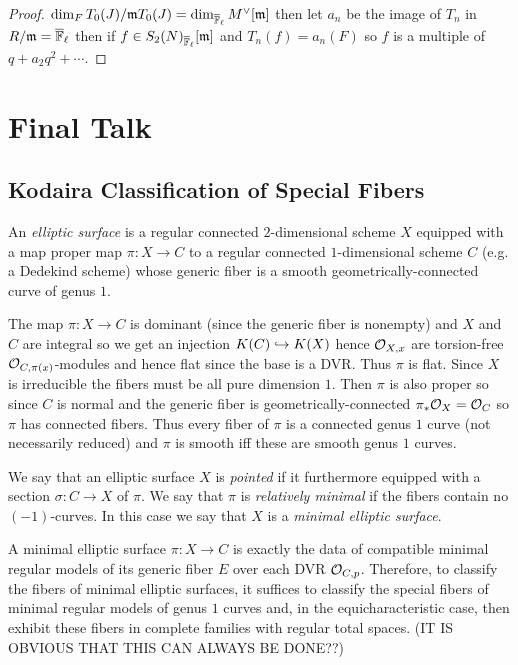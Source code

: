 \documentclass[12pt]{article}
\begin{document}
\begin{proof}
$\dim_F T_0(J) / \mathfrak{m} T_0(J) = \dim_{\overline{\mathbb{F}}_\ell} M^\vee[\mathfrak{m}]$ then let $a_n$ be the image of $T_n$ in $R / \mathfrak{m} = \overline{\mathbb{F}}_\ell$ then if $f \in S_2(N)_{\overline{\mathbb{F}}_\ell}[\mathfrak{m}]$ and $T_n(f) = a_n(F)$ so $f$ is a multiple of $q + a_2 q^2 + \cdots$. 
\end{proof}

\section{Final Talk}

\subsection{Kodaira Classification of Special Fibers}

\begin{defn}
An \textit{elliptic surface} is a regular connected $2$-dimensional scheme $X$ equipped with a map proper map $\pi : X \to C$ to a regular connected $1$-dimensional scheme $C$ (e.g. a Dedekind scheme) whose generic fiber is a smooth geometrically-connected curve of genus $1$.
\end{defn}

\begin{rmk}
The map $\pi : X \to C$ is dominant (since the generic fiber is nonempty) and $X$ and $C$ are integral so we get an injection $K(C) \hookrightarrow K(X)$ hence $\mathcal{O}_{X, x}$ are torsion-free $\mathcal{O}_{C, \pi(x)}$-modules and hence flat since the base is a DVR. Thus $\pi$ is flat. Since $X$ is irreducible the fibers must be all pure dimension $1$. Then $\pi$ is also proper so since $C$ is normal and the generic fiber is geometrically-connected $\pi_* \mathcal{O}_{X} = \mathcal{O}_{C}$ so $\pi$ has connected fibers. Thus every fiber of $\pi$ is a connected genus $1$ curve (not necessarily reduced) and $\pi$ is smooth iff these are smooth genus $1$ curves. 
\end{rmk}

\begin{defn}
We say that an elliptic surface $X$ is \textit{pointed} if it furthermore equipped with a section $\sigma : C \to X$ of $\pi$. We say that $\pi$ is \textit{relatively minimal} if the fibers contain no $(-1)$-curves. In this case we say that $X$ is a \textit{minimal elliptic surface}.
\end{defn}

\begin{rmk}
A minimal elliptic surface $\pi : X \to C$ is exactly the data of compatible minimal regular models of its generic fiber $E$ over each DVR $\mathcal{O}_{C, p}$. Therefore, to classify the fibers of minimal elliptic surfaces, it suffices to classify the special fibers of minimal regular models of genus $1$ curves and, in the equicharacteristic case, then exhibit these fibers in complete families with regular total spaces. (IT IS OBVIOUS THAT THIS CAN ALWAYS BE DONE??)
\end{rmk}
\end{document}
